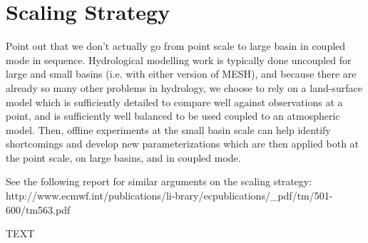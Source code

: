 \documentclass[hess]{copernicus}
\begin{document}
\section{Scaling Strategy}
Point out that we don't actually go from point scale to large basin in coupled mode in sequence. Hydrological modelling work is typically done uncoupled for large and small basins (i.e. with either version of MESH), and because there are already so many other problems in hydrology, we choose to rely on a land-surface model which is sufficiently detailed to compare well against observations at a point, and is sufficiently well balanced to be used coupled to an atmospheric model. Then, offline experiments at the small basin scale can help identify shortcomings and develop new parameterizations which are then applied both at the point scale, on large basins, and in coupled mode.

See the following report for similar arguments on the scaling strategy: http://www.ecmwf.int/publications/li-brary/ecpublications/\_pdf/tm/501-600/tm563.pdf


\conclusions




%




\begin{acknowledgements}
TEXT
\end{acknowledgements}





%
%
%
%
%
%
%
\end{document}
